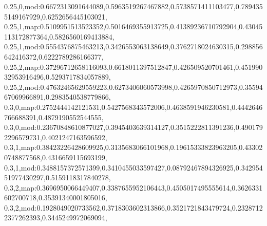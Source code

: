 0.25,0,mod:0.6672313091644089,0.5963519267467882,0.5738571411103477,0.7894355149167929,0.6252656445103021,
0.25,1,map:0.5109951513523352,0.5016469355913725,0.41389236710792904,0.43045113172877364,0.5826560169413884,
0.25,1,mod:0.5554376875463213,0.3426553063138649,0.3762718024630315,0.298856642416372,0.6222789286166377,
0.25,2,map:0.37296712658116093,0.6618011397512847,0.426509520701461,0.45199032953916496,0.5293717834057889,
0.25,2,mod:0.47632465629559223,0.6273406060573998,0.4265970850712973,0.3559467069966891,0.2983540538779866,
0.3,0,map:0.2752444142121531,0.5427568343572006,0.4638591946230581,0.4442646766688391,0.4879190552544555,
0.3,0,mod:0.23670848610877027,0.3945403639314127,0.3515222811391236,0.4901792296579731,0.4021247163596592,
0.3,1,map:0.38423226428609925,0.3135683066101968,0.19615333823963205,0.433020748877568,0.4316659115693199,
0.3,1,mod:0.3488157372571399,0.3410455033597427,0.08792467894326925,0.34295451977430297,0.5159118317840278,
0.3,2,map:0.3696950066449407,0.3387655952106443,0.4505017495555614,0.3626331602700718,0.35391340001805016,
0.3,2,mod:0.1928049020733562,0.3718303602313866,0.3521721843479724,0.23287122377262393,0.3445249972069094,
